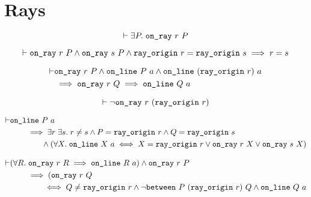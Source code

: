 \section{Rays}
\begin{equation*}
  \vdash\exists P.\; \texttt{on\_ray}\ r\ P
\end{equation*}

\begin{equation*}
    \vdash\texttt{on\_ray}\ r\ P \wedge \texttt{on\_ray}\ s\ P\wedge\texttt{ray\_origin}\ r = \texttt{ray\_origin}\ s\implies r = s
\end{equation*}

\begin{equation*}
  \begin{split}
    \vdash&\texttt{on\_ray}\ r\ P \wedge \texttt{on\_line}\ P\ a \wedge \texttt{on\_line}\ (\texttt{ray\_origin}\ r)\ a\\
    &\implies \texttt{on\_ray}\ r\ Q \implies \texttt{on\_line}\ Q\ a
  \end{split}
\end{equation*}

\begin{equation*}
\vdash\neg\texttt{on\_ray}\ r\ (\texttt{ray\_origin}\ r)
\end{equation*}

\begin{equation*}
  \begin{split}
    \vdash&\texttt{on\_line}\ P\ a\\
    &\qquad\implies \exists r\;\exists s.\; r \neq s\wedge P = \texttt{ray\_origin}\ r \wedge Q = \texttt{ray\_origin}\ s\\
    &\qquad\qquad \wedge (\forall X.\; \texttt{on\_line}\ X\ a \iff X = \texttt{ray\_origin}\ r \vee \texttt{on\_ray}\ r\ X \vee \texttt{on\_ray}\ s\ X)
    \end{split}
\end{equation*}

\begin{equation*}
  \begin{split}
    \vdash&(\forall R.\; \texttt{on\_ray}\ r\ R \implies \texttt{on\_line}\ R\ a) \wedge \texttt{on\_ray}\ r\ P\\
    &\qquad\implies (\texttt{on\_ray}\ r\ Q\\
    &\qquad\qquad\iff Q \neq \texttt{ray\_origin}\ r \wedge \neg\texttt{between}\ P\ (\texttt{ray\_origin}\ r)\ Q \wedge \texttt{on\_line}\ Q\ a
  \end{split}
\end{equation*}
